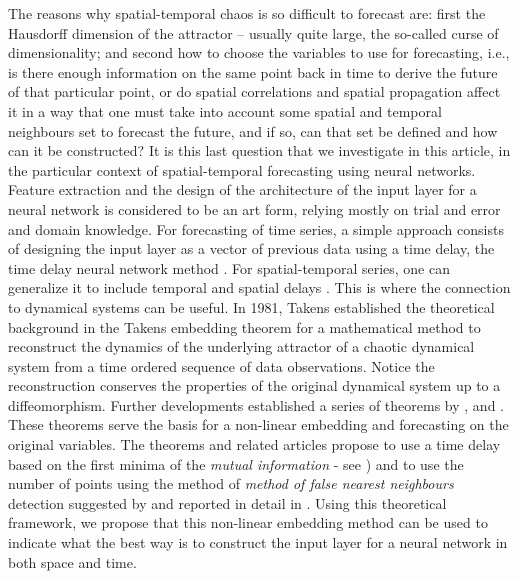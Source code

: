 \documentclass[journal]{IEEEtran}
\begin{document}
The reasons why spatial-temporal chaos is so difficult to forecast are: first the Hausdorff dimension of the 
attractor \cite{1985PhLA..107..101G} -- usually quite large, the so-called curse
of dimensionality; and second how to choose the variables to use for forecasting, i.e., is there 
enough information on the same point back in time to derive the future of that particular point, or do spatial correlations and spatial 
propagation affect it in a way that one must take into account some spatial and temporal neighbours set to forecast the future, and if 
so, can that set be defined and how can it be constructed? It is this last question that we investigate in this article, in the 
particular context of spatial-temporal forecasting using neural networks. Feature extraction and the design of the architecture of the 
input layer for a neural network is considered to be an art form, relying mostly on trial and error and domain knowledge. For 
forecasting of time series, a simple approach consists of designing the input layer as a vector of previous data using a time delay, the 
time delay neural network method \cite{Waibel:1990:PRU:108235.108263, luk2000study, Frank2001, OH2002249, 1009-1963-12-6-304, 
inputlayer}. For spatial-temporal series, one can generalize it to include temporal and spatial delays 
\cite{covas2016,covaspeixinhojoao}. This is where the connection to dynamical systems can be useful. In 1981, Takens established the 
theoretical background \cite{1981LNM...898..366T} in the Takens embedding theorem for a mathematical method to reconstruct the dynamics 
of the underlying attractor of a chaotic dynamical system from a time ordered sequence of data observations. Notice the reconstruction 
conserves the properties of the original dynamical system up to a diffeomorphism. 
 Further developments established a series of theorems by \cite{key1503303m}, \cite{1981LNM...898..366T, 1981LNM...898..230M} and 
\cite{1991JSP....65..579S}. These theorems serve the basis for a non-linear embedding and forecasting on the original variables. The 
theorems and related articles propose to use a time delay based on the first minima of the {\em mutual information} - see 
\cite{Fraser86, abarbanel1997analysis, opac-b1092652}) and to use the number of points using  the method of {\em method of false 
nearest neighbours} detection suggested by \cite{1992PhRvA..45.3403K} and reported in detail in \cite{1992PhRvA..45.7058M, 
1993RvMP...65.1331A, 1996PhT....49k..86A, abarbanel1997analysis}. Using this theoretical framework, we propose that this non-linear 
embedding method can be used to indicate what the best way is to construct the input layer for a neural network in both space and time.
\end{document}
